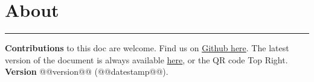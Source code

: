 \section{About}
\hrule

\medskip

\textbf{Contributions} to this doc are welcome. Find us on \href{https://github.com/robert-will-brown/video-streaming-cheatsheet}{Github here}.
The latest version of the document is always available \href{https://bit.ly/3p1Omqh}{here}, or the QR code Top Right.
\textbf{Version} @@version@@ (@@datestamp@@).
